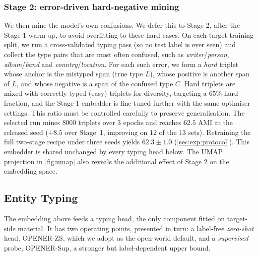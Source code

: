 \documentclass[pdflatex,sn-basic,Numbered]{sn-jnl}
\begin{document}
\subsubsection{Stage 2: error-driven hard-negative mining}
We then mine the model's own confusions. We defer this to Stage 2, after the Stage-1 warm-up, to avoid overfitting to these hard cases.
On each target training split, we run a cross-validated typing pass (so no test label is ever seen) and collect the type pairs that are most often confused, such as \emph{writer}/\emph{person}, \emph{album}/\emph{band} and \emph{country}/\emph{location}.
For each such error, we form a \emph{hard} triplet whose anchor is the mistyped span (true type $L$), whose positive is another span of $L$, and whose negative is a span of the confused type $C$.
Hard triplets are mixed with correctly-typed (easy) triplets for diversity, targeting a $65\%$ hard fraction, and the Stage-1 embedder is fine-tuned further with the same optimiser settings. This ratio must be controlled carefully to preserve generalisation.
The selected run mines $8000$ triplets over $3$ epochs and reaches $62.5$ AMI at the released seed ($+8.5$ over Stage~1, improving on $12$ of the $13$ sets). Retraining the full two-stage recipe under three seeds yields $62.3 \pm 1.0$ (\autoref{sec:exp:protocol}).
This embedder is shared unchanged by every typing head below. The UMAP projection in \autoref{fig:umap} also reveals the additional effect of Stage 2 on the embedding space.

\subsection{Entity Typing}
\label{sec:method:typing}

The embedding above feeds a typing head, the only component fitted on target-side material. It has two operating points, presented in turn: a label-free \emph{zero-shot} head, OPENER-ZS, which we adopt as the open-world default, and a \emph{supervised} probe, OPENER-Sup, a stronger but label-dependent upper bound.
\end{document}
